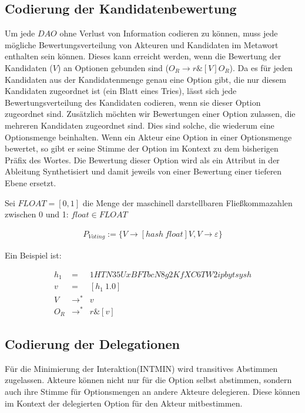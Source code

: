 \documentclass[a4paper,12pt]{report}
\begin{document}
\subsection{Codierung der Kandidatenbewertung}
Um jede $DAO$ ohne Verlust von Information codieren zu können, muss jede mögliche Bewertungsverteilung von Akteuren und Kandidaten im Metawort enthalten sein können. 
Dieses kann erreicht werden, wenn die Bewertung der Kandidaten ($V$) an Optionen gebunden sind ($O_R \rightarrow r\& [V] O_R$). Da es für jeden Kandidaten aus der Kandidatenmenge genau eine Option gibt, die nur diesem Kandidaten zugeordnet ist (ein Blatt eines Tries), lässt sich jede Bewertungsverteilung des Kandidaten codieren, wenn sie dieser Option zugeordnet sind. Zusätzlich möchten wir Bewertungen einer Option zulassen, die mehreren Kandidaten zugeordnet sind. Dies sind solche, die wiederum eine Optionsmenge beinhalten. Wenn ein Akteur eine Option in einer Optionsmenge bewertet, so gibt er seine Stimme der Option im Kontext zu dem bisherigen Präfix des Wortes.
Die Bewertung dieser Option wird als ein Attribut in der Ableitung Synthetisiert\cite{Knuth1968} und damit jeweils von einer Bewertung einer tieferen Ebene ersetzt.

Sei $FLOAT = [0,1]$ die Menge der maschinell darstellbaren Fließkommazahlen zwischen 0 und 1: $float\in FLOAT$

\begin{eqnarray}
P_{Voting} := \{V\rightarrow [hash\ float]V, V \rightarrow \varepsilon\}
\end{eqnarray}
  
 Ein Beispiel ist:

\begin{eqnarray}
  h_1 &=& 1HTN35UxBFTbcN8g2KfXC6TW2ipbytsysh\\
  v &=& [h_1\ 1.0] \\
  V &\rightarrow^*& v \\
  O_R &\rightarrow^*& r\&[v]
\end{eqnarray}



\subsection{Codierung der Delegationen}

Für die Minimierung der Interaktion(INTMIN) wird transitives Abstimmen zugelassen. Akteure können nicht nur für die Option selbst abstimmen, sondern auch ihre Stimme für Optionsmengen an andere Akteure delegieren. Diese können im Kontext der delegierten Option für den Akteur mitbestimmen.
\end{document}

